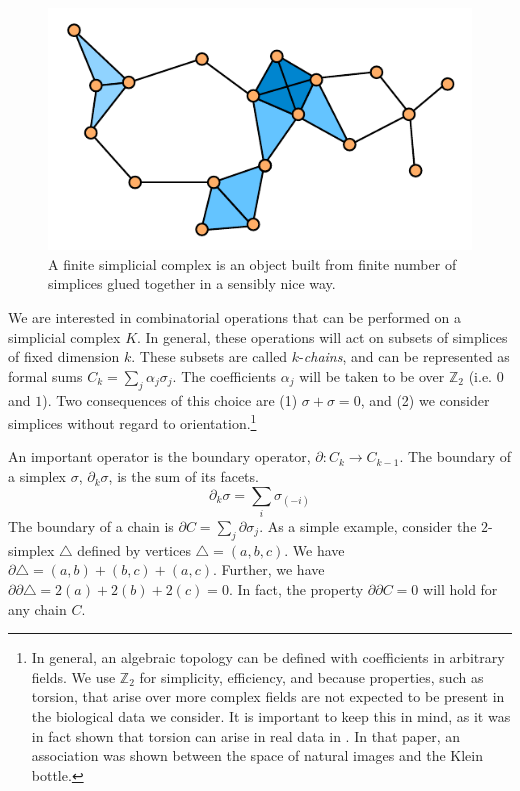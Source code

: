 \begin{figure}
\centering
\includegraphics[]{./fig/background/simplicial_complex.pdf}
\caption[Simplicial Complex: A discrete topological space]{A finite simplicial complex is an object built from finite number of simplices glued together in a sensibly nice way.}
\label{fig:bg:simplicial_complex}
\end{figure}

We are interested in combinatorial operations that can be performed on a simplicial complex $K$.
In general, these operations will act on subsets of simplices of fixed dimension $k$.
These subsets are called $k$-\emph{chains}, and can be represented as formal sums $C_{k}=\sum_{j}\alpha_{j}\sigma_{j}$.
The coefficients $\alpha_j$ will be taken to be over $\mathbb{Z}_2$ (i.e. $0$ and $1$).
Two consequences of this choice are (1) $\sigma+\sigma=0$, and (2) we consider simplices without regard to orientation.\footnote{In general, an algebraic topology can be defined with coefficients in arbitrary fields. We use $\mathbb{Z}_2$ for simplicity, efficiency, and because properties, such as torsion, that arise over more complex fields are not expected to be present in the biological data we consider. It is important to keep this in mind, as it was in fact shown that torsion can arise in real data in \cite{Carlsson:2008up}. In that paper, an association was shown between the space of natural images and the Klein bottle.}

An important operator is the boundary operator, $\partial:C_{k}\rightarrow{C_{k-1}}$.
The boundary of a simplex $\sigma$, $\partial_{k}\sigma$, is the sum of its facets.
\begin{equation}
\partial_{k}\sigma = \sum_{i}{\sigma_{(-i)}}
\end{equation}
The boundary of a chain is $\partial C = \sum_{j}\partial\sigma_{j}$.
As a simple example, consider the $2$-simplex $\triangle$ defined by vertices $\triangle=(a,b,c)$.
We have $\partial\triangle = (a,b) + (b,c) + (a,c)$.
Further, we have $\partial\partial\triangle = 2(a) + 2(b) + 2(c) = 0$.
In fact, the property $\partial\partial C = 0$ will hold for any chain $C$.

